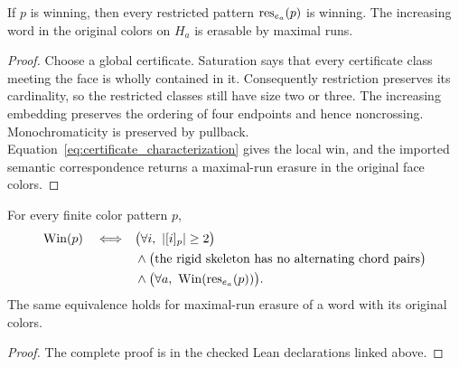 \begin{lemma}\label{lem:restriction}
If $p$ is winning, then every restricted pattern $\operatorname{res}_{e_a}(p)$ is winning.
The increasing word in the original colors on $H_a$ is erasable by maximal
runs.
\leanok
{}
\end{lemma}
\begin{proof}
Choose a global certificate. Saturation says that every certificate class
meeting the face is wholly contained in it. Consequently restriction
preserves its cardinality, so the restricted classes still have size two
or three. The increasing embedding preserves the ordering of four endpoints
and hence noncrossing. Monochromaticity is preserved by pullback.
Equation~\eqref{eq:certificate_characterization} gives the local win, and the
imported semantic correspondence returns a maximal-run erasure in the
original face colors.
\leanok
\end{proof}

\begin{theorem}\label{thm:face_lemma}
For every finite color pattern $p$,
\begin{align*}
 \operatorname{Win}(p)\quad\Longleftrightarrow\quad&
 \bigl(\forall i,\ \lvert [i]_p\rvert\geq2\bigr)\\
 &{}\land\bigl(\text{the rigid skeleton has no alternating chord pairs}\bigr)\\
 &{}\land\bigl(\forall a,\ \operatorname{Win}(\operatorname{res}_{e_a}(p))\bigr).
\end{align*}
The same equivalence holds for maximal-run erasure of a word with its
original colors.
\leanok
{}
\end{theorem}
\begin{proof}\leanok
The complete proof is in the checked Lean declarations linked above.
\end{proof}


